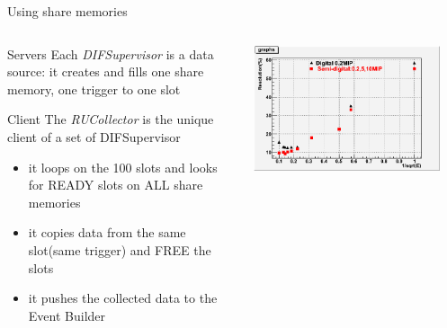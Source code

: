 \documentclass[10pt]{beamer}
\begin{document}
\begin{frame}{Using share memories}
\begin{columns}
 \begin{column}{0.5\textwidth}
\begin{block}{Servers}
Each {\sl DIFSupervisor} is a data source: it creates and fills one share memory, one trigger to one slot
\end{block}
\pause 
\begin{block}{Client}
 The {\sl RUCollector} is the unique client of a set of DIFSupervisor
 \begin{itemize}
   \item it loops on the 100 slots and looks for READY slots on ALL share memories
   \item it copies data from the same slot(same trigger) and FREE the slots
   \item it pushes the collected data to the Event Builder 
 \end{itemize}
\end{block}
\end{column}
 \begin{column}{0.5\textwidth}
   \centerline{\includegraphics[width=0.9\textwidth]{images/DigitalSemiDigital}}
\end{column}
\end{columns}


\end{frame}
\end{document}
